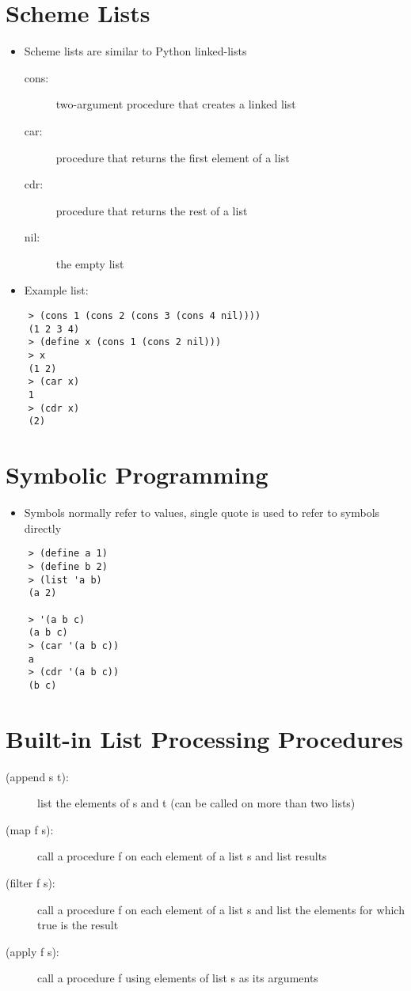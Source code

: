 \section{Scheme Lists}
\begin{itemize}
    \item Scheme lists are similar to Python linked-lists
    \begin{description}
        \item [cons:] two-argument procedure that creates a linked list
        \item [car:] procedure that returns the first element of a list
        \item [cdr:] procedure that returns the rest of a list
        \item [nil:] the empty list
    \end{description}
    \item Example list:
\end{itemize}
\begin{verbatim}
    > (cons 1 (cons 2 (cons 3 (cons 4 nil))))
    (1 2 3 4)
    > (define x (cons 1 (cons 2 nil)))
    > x
    (1 2)
    > (car x)
    1
    > (cdr x)
    (2)
\end{verbatim}

\section{Symbolic Programming}
\begin{itemize}
    \item Symbols normally refer to values, single quote is used to refer to symbols directly
\end{itemize}
\begin{verbatim}
    > (define a 1)
    > (define b 2)
    > (list 'a b)
    (a 2)

    > '(a b c)
    (a b c)
    > (car '(a b c))
    a
    > (cdr '(a b c))
    (b c)
\end{verbatim}

\section{Built-in List Processing Procedures}
\begin{description}
    \item [(append s t):] list the elements of s and t (can be called on more than two lists)
    \item [(map f s):] call a procedure f on each element of a list s and list results
    \item [(filter f s):] call a procedure f on each element of a list s and list the elements for which true is the result
    \item [(apply f s):] call a procedure f using elements of list s as its arguments
\end{description}

